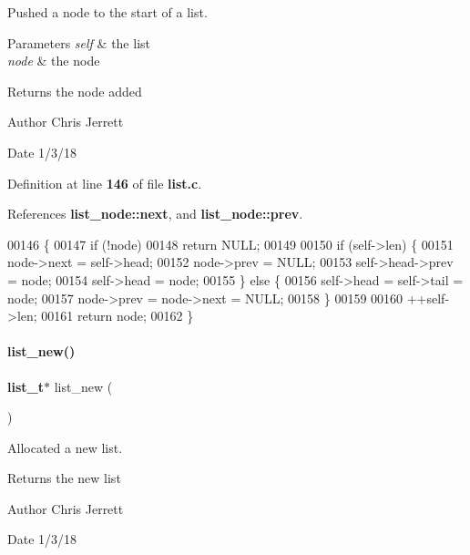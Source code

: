Pushed a node to the start of a list. 


\begin{DoxyParams}{Parameters}
{\em self} & the list \\
\hline
{\em node} & the node \\
\hline
\end{DoxyParams}
\begin{DoxyReturn}{Returns}
the node added 
\end{DoxyReturn}
\begin{DoxyAuthor}{Author}
Chris Jerrett 
\end{DoxyAuthor}
\begin{DoxyDate}{Date}
1/3/18 
\end{DoxyDate}


Definition at line \textbf{ 146} of file \textbf{ list.\+c}.



References \textbf{ list\+\_\+node\+::next}, and \textbf{ list\+\_\+node\+::prev}.


\begin{DoxyCode}
00146                                                          \{
00147   \textcolor{keywordflow}{if} (!node)
00148     \textcolor{keywordflow}{return} NULL;
00149 
00150   \textcolor{keywordflow}{if} (self->len) \{
00151     node->next = \textcolor{keyword}{self}->head;
00152     node->prev = NULL;
00153     \textcolor{keyword}{self}->head->prev = node;
00154     \textcolor{keyword}{self}->head = node;
00155   \} \textcolor{keywordflow}{else} \{
00156     \textcolor{keyword}{self}->head = \textcolor{keyword}{self}->tail = node;
00157     node->prev = node->next = NULL;
00158   \}
00159 
00160   ++\textcolor{keyword}{self}->len;
00161   \textcolor{keywordflow}{return} node;
00162 \}
\end{DoxyCode}
\mbox{\label{list_8c_a9dd3eafdb56dcc64689f78fb4acdff3f}} 
\paragraph{list\+\_\+new()}
{\footnotesize\ttfamily \textbf{ list\+\_\+t}$\ast$ list\+\_\+new (\begin{DoxyParamCaption}{ }\end{DoxyParamCaption})}



Allocated a new list. 

\begin{DoxyReturn}{Returns}
the new list 
\end{DoxyReturn}
\begin{DoxyAuthor}{Author}
Chris Jerrett 
\end{DoxyAuthor}
\begin{DoxyDate}{Date}
1/3/18 
\end{DoxyDate}



